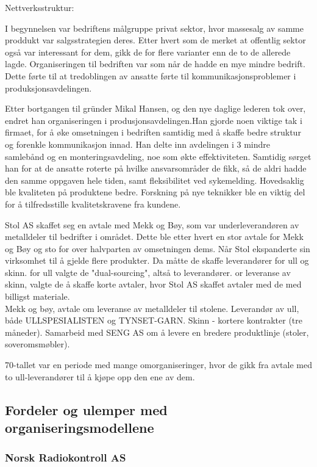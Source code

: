 Nettverksstruktur:

I begynnelsen var bedriftens målgruppe privat sektor, hvor massesalg av samme proddukt var salgsstrategien deres. Etter hvert som de merket  at offentlig sektor også var interessant for dem, gikk de for flere varianter enn de to de allerede lagde. Organiseringen til bedriften var som når de hadde en mye mindre bedrift. Dette førte til at tredoblingen av ansatte førte til kommunikasjonsproblemer i produksjonsavdelingen.

Etter bortgangen til gründer Mikal Hansen, og den nye daglige lederen tok over, endret han organiseringen i produsjonsavdelingen.Han gjorde noen viktige tak i firmaet, for å øke omsetningen i bedriften samtidig med å skaffe bedre struktur og forenkle kommunikasjon innad. Han delte inn avdelingen i 3 mindre samlebånd og en monteringsavdeling, noe som økte effektiviteten. Samtidig sørget han for at de ansatte roterte på hvilke ansvarsområder de fikk, så de aldri hadde den samme oppgaven hele tiden, samt fleksibilitet ved sykemelding. Hovedsaklig ble kvaliteten på produktene bedre. Forskning på nye teknikker ble en viktig del for å tilfredsstille kvalitetskravene fra kundene.   

Stol AS skaffet seg en avtale med Mekk og Bøy, som var underleverandøren av metalldeler til bedrifter i området. Dette ble etter hvert en stor avtale for Mekk og Bøy og sto for over halvparten av omsetningen dems. Når Stol ekspanderte sin virksomhet til å gjelde flere produkter. Da måtte de skaffe leverandører for ull og skinn. for ull valgte de "dual-sourcing", altså to leverandører. or leveranse av skinn, valgte de å skaffe korte avtaler, hvor Stol AS skaffet avtaler med de med billigst materiale. \\


Mekk og bøy, avtale om leveranse av metalldeler til stolene.
Leverandør av ull, både ULLSPESIALISTEN og TYNSET-GARN.
Skinn - kortere kontrakter (tre måneder).
Samarbeid med SENG AS om å levere en bredere produktlinje (stoler, soveromsmøbler).

70-tallet var en periode med mange omorganiseringer, hvor de gikk fra avtale med to ull-leverandører til å kjøpe opp den ene av dem.

\subsection{Fordeler og ulemper med organiseringsmodellene}

\subsubsection{Norsk Radiokontroll AS}


